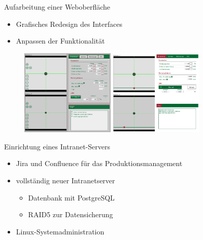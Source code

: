 \documentclass[xcolor=dvipsnames]{beamer}
\begin{document}
\begin{frame}{Aufarbeitung einer Weboberfläche}
\begin{itemize}
\item Grafisches Redesign des Interfaces
\item Anpassen der Funktionalität
\end{itemize}
\begin{figure}[t]
\includegraphics[width=0.4\textwidth]{media/webinterface-alt.png}
\includegraphics[width=0.4\textwidth]{media/webinterface.png}
\end{figure}
\end{frame}

\begin{frame}{Einrichtung eines Intranet-Servers}
\begin{itemize}
\item Jira und Confluence für das Produktionsmanagement
\item vollständig neuer Intranetserver
\begin{itemize}
\item Datenbank mit PostgreSQL
\item RAID5 zur Datensicherung
\end{itemize}
\item Linux-Systemadministration
\end{itemize}
\end{frame}
\end{document}
